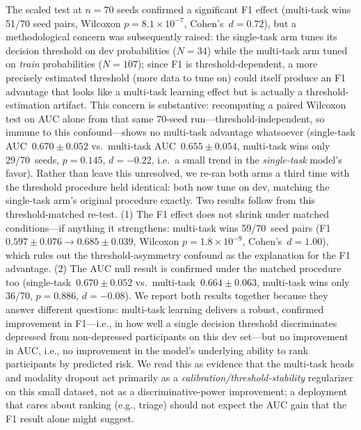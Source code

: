 \documentclass[journal]{IEEEtran}
\begin{document}
The scaled test at $n{=}70$ seeds confirmed a significant F1 effect
(multi-task wins 51/70 seed pairs, Wilcoxon $p{=}8.1{\times}10^{-7}$,
Cohen's~$d{=}0.72$), but a methodological concern was subsequently
raised: the single-task arm tunes its decision threshold on dev
probabilities ($N{=}34$) while the multi-task arm tuned on
\emph{train} probabilities ($N{=}107$); since F1 is
threshold-dependent, a more precisely estimated threshold (more data
to tune on) could itself produce an F1 advantage that looks like a
multi-task learning effect but is actually a threshold-estimation
artifact. This concern is substantive: recomputing a paired Wilcoxon
test on AUC alone from that same 70-seed run---threshold-independent,
so immune to this confound---shows no multi-task advantage
whatsoever (single-task AUC~$0.670\pm0.052$ vs.\ multi-task
AUC~$0.655\pm0.054$, multi-task wins only 29/70~seeds, $p{=}0.145$,
$d{=}-0.22$, i.e.\ a small trend in the \emph{single-task} model's
favor). Rather than leave this unresolved, we re-ran both arms a
third time with the threshold procedure held identical: both now
tune on dev, matching the single-task arm's original procedure
exactly. Two results follow from this threshold-matched re-test. (1)
The F1 effect does not shrink under matched conditions---if anything
it strengthens: multi-task wins 59/70~seed pairs
(F1~$0.597\pm0.076\to0.685\pm0.039$, Wilcoxon
$p{=}1.8{\times}10^{-9}$, Cohen's~$d{=}1.00$), which rules out the
threshold-asymmetry confound as the explanation for the F1 advantage.
(2) The AUC null result is confirmed under the matched procedure too
(single-task~$0.670\pm0.052$ vs.\ multi-task~$0.664\pm0.063$,
multi-task wins only 36/70, $p{=}0.886$, $d{=}-0.08$). We report both
results together because they answer different questions: multi-task
learning delivers a robust, confirmed improvement in F1---i.e., in
how well a single decision threshold discriminates depressed from
non-depressed participants on this dev set---but no improvement in
AUC, i.e., no improvement in the model's underlying ability to rank
participants by predicted risk. We read this as evidence that the
multi-task heads and modality dropout act primarily as a
\emph{calibration/threshold-stability} regularizer on this small
dataset, not as a discriminative-power improvement; a deployment that
cares about ranking (e.g., triage) should not expect the AUC gain
that the F1 result alone might suggest.
\end{document}
